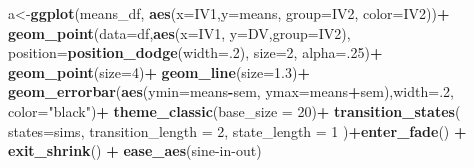 \documentclass[
]{book}
\newenvironment{Shaded}{\begin{snugshade}}{\end{snugshade}}
\newcommand{\AttributeTok}[1]{\textcolor[rgb]{0.13,0.29,0.53}{#1}}
\newcommand{\DecValTok}[1]{\textcolor[rgb]{0.00,0.00,0.81}{#1}}
\newcommand{\FloatTok}[1]{\textcolor[rgb]{0.00,0.00,0.81}{#1}}
\newcommand{\FunctionTok}[1]{\textcolor[rgb]{0.13,0.29,0.53}{\textbf{#1}}}
\newcommand{\NormalTok}[1]{#1}
\newcommand{\OtherTok}[1]{\textcolor[rgb]{0.56,0.35,0.01}{#1}}
\newcommand{\SpecialCharTok}[1]{\textcolor[rgb]{0.81,0.36,0.00}{\textbf{#1}}}
\newcommand{\StringTok}[1]{\textcolor[rgb]{0.31,0.60,0.02}{#1}}
\begin{document}
\begin{Shaded}
\begin{Highlighting}[]
\NormalTok{a}\OtherTok{\textless{}{-}}\FunctionTok{ggplot}\NormalTok{(means\_df, }\FunctionTok{aes}\NormalTok{(}\AttributeTok{x=}\NormalTok{IV1,}\AttributeTok{y=}\NormalTok{means, }
                                           \AttributeTok{group=}\NormalTok{IV2,}
                                           \AttributeTok{color=}\NormalTok{IV2))}\SpecialCharTok{+}
  \FunctionTok{geom\_point}\NormalTok{(}\AttributeTok{data=}\NormalTok{df,}\FunctionTok{aes}\NormalTok{(}\AttributeTok{x=}\NormalTok{IV1, }\AttributeTok{y=}\NormalTok{DV,}\AttributeTok{group=}\NormalTok{IV2), }
             \AttributeTok{position=}\FunctionTok{position\_dodge}\NormalTok{(}\AttributeTok{width=}\NormalTok{.}\DecValTok{2}\NormalTok{),}
             \AttributeTok{size=}\DecValTok{2}\NormalTok{,}
             \AttributeTok{alpha=}\NormalTok{.}\DecValTok{25}\NormalTok{)}\SpecialCharTok{+}
  \FunctionTok{geom\_point}\NormalTok{(}\AttributeTok{size=}\DecValTok{4}\NormalTok{)}\SpecialCharTok{+}
  \FunctionTok{geom\_line}\NormalTok{(}\AttributeTok{size=}\FloatTok{1.3}\NormalTok{)}\SpecialCharTok{+}
  \FunctionTok{geom\_errorbar}\NormalTok{(}\FunctionTok{aes}\NormalTok{(}\AttributeTok{ymin=}\NormalTok{means}\SpecialCharTok{{-}}\NormalTok{sem, }\AttributeTok{ymax=}\NormalTok{means}\SpecialCharTok{+}\NormalTok{sem),}\AttributeTok{width=}\NormalTok{.}\DecValTok{2}\NormalTok{,}
                \AttributeTok{color=}\StringTok{"black"}\NormalTok{)}\SpecialCharTok{+}
  \FunctionTok{theme\_classic}\NormalTok{(}\AttributeTok{base\_size =} \DecValTok{20}\NormalTok{)}\SpecialCharTok{+}
  \FunctionTok{transition\_states}\NormalTok{(}
    \AttributeTok{states=}\NormalTok{sims,}
    \AttributeTok{transition\_length =} \DecValTok{2}\NormalTok{,}
    \AttributeTok{state\_length =} \DecValTok{1}
\NormalTok{  )}\SpecialCharTok{+}\FunctionTok{enter\_fade}\NormalTok{() }\SpecialCharTok{+} 
  \FunctionTok{exit\_shrink}\NormalTok{() }\SpecialCharTok{+}
  \FunctionTok{ease\_aes}\NormalTok{(}\StringTok{\textquotesingle{}sine{-}in{-}out\textquotesingle{}}\NormalTok{)}


\end{Highlighting}
\end{Shaded}
\end{document}
